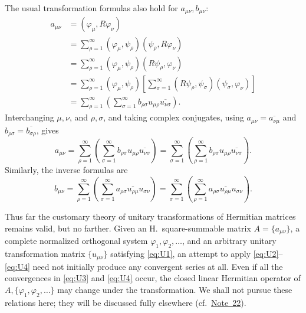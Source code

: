 ﻿\documentclass[paper=b5,fontsize=13pt,bookmarkpackage=false,twoside]{scrartcl}
\newcounter{translatornote}
\begin{document}
The usual transformation formulas also hold for
\(a_{\mu\nu},b_{\mu\nu}\):
\begin{align*}
 a_{\mu\nu}
 &=(\varphi_\mu,R\varphi_\nu)\\
 &=\sum_{\rho=1}^{\infty}
   (\varphi_\mu,\psi_\rho)(\psi_\rho,R\varphi_\nu)\\
 &=\sum_{\rho=1}^{\infty}
   (\varphi_\mu,\psi_\rho)(R\psi_\rho,\varphi_\nu)\\
 &=\sum_{\rho=1}^{\infty}
   (\varphi_\mu,\psi_\rho)
   \left[\sum_{\sigma=1}^{\infty}
      (R\psi_\rho,\psi_\sigma)(\psi_\sigma,\varphi_\nu)\right]\\
 &=\sum_{\rho=1}^{\infty}
   \left(\sum_{\sigma=1}^{\infty}
     b_{\rho\sigma}u_{\mu\rho}\overline{u_{\nu\sigma}}\right).
\end{align*}
Interchanging \(\mu,\nu\), and \(\rho,\sigma\), and taking complex
conjugates, using
\(a_{\mu\nu}=\overline{a_{\nu\mu}}\) and
\(b_{\rho\sigma}=\overline{b_{\sigma\rho}}\), gives
\begin{equation}
 a_{\mu\nu}
 =\sum_{\rho=1}^{\infty}
   \left(\sum_{\sigma=1}^{\infty}
     b_{\rho\sigma}u_{\mu\rho}\overline{u_{\nu\sigma}}\right)
 =\sum_{\sigma=1}^{\infty}
   \left(\sum_{\rho=1}^{\infty}
     b_{\rho\sigma}u_{\mu\rho}\overline{u_{\nu\sigma}}\right).
 \tag{U\(_3\)}\label{eq:U3}
\end{equation}
Similarly, the inverse formulas are
\begin{equation}
 b_{\mu\nu}
 =\sum_{\rho=1}^{\infty}
   \left(\sum_{\sigma=1}^{\infty}
     a_{\rho\sigma}\overline{u_{\rho\mu}}u_{\sigma\nu}\right)
 =\sum_{\sigma=1}^{\infty}
   \left(\sum_{\rho=1}^{\infty}
     a_{\rho\sigma}\overline{u_{\rho\mu}}u_{\sigma\nu}\right).
 \tag{U\(_4\)}\label{eq:U4}
\end{equation}

Thus far the customary theory of unitary transformations of Hermitian
matrices remains valid, but no farther.  Given an H.\ square-summable
matrix \(A=\{a_{\mu\nu}\}\), a complete normalized orthogonal system
\(\varphi_1,\varphi_2,\ldots\), and an arbitrary unitary transformation
matrix \(\{u_{\mu\nu}\}\) satisfying \eqref{eq:U1}, an attempt to apply
\eqref{eq:U2}--\eqref{eq:U4} need not initially produce any convergent
series at all.  Even if all the convergences in \eqref{eq:U3} and
\eqref{eq:U4} occur, the closed linear Hermitian operator of
\(A,\{\varphi_1,\varphi_2,\ldots\}\) may change under the
transformation.  We shall not pursue these relations here; they will
be discussed fully elsewhere (cf.\ \hyperref[fn:source-22]{Note~22}).
\end{document}
